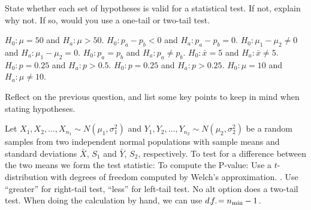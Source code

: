 \pagestyle{fancy}
\renewcommand{\theUnit}{8}
\ifthenelse{\isundefined{\UnitPageNumbers}}{}{\setcounter{page}{1}}
\rhead{Chapter  \theUnit: Hypothesis Tests}
\rfoot{\mypage}
\renewcommand{\footrulewidth}{.4pt}
\vspace*{-20pt} \thispagestyle{firstfooter}




\bb
\ii State whether each set of hypotheses is valid for a statistical test.  If not, explain why not.  If so, would you use a one-tail or two-tail test.

\bb
\ii $H_0:  \mu = 50$ and $H_a: \mu > 50$. \ms
\ii $H_0: p_a - p_b <0$ and $H_a:  p_a - p_b=0$. \ms
\ii $H_0:  \mu_1 - \mu_2 \ne 0 $ and $H_a: \mu_1 -\mu_2 =0$. \ms
\ii $H_0:  p_a = p_b$ and $H_a: p_a \ne p_b$. \ms
\ii $H_0: \bar{x} = 5$ and $H_a:  \bar{x} \ne 5$. \ms
\ii $H_0: p = 0.25$ and $H_a: p>0.5$. \ms
\ii $H_0: p = 0.25$ and $H_a: p>0.25$. \ms
\ii $H_0: \mu = 10$ and $H_a:  \mu \ne 10$. \ms
\ee


\ii Reflect on the previous question, and list some key points to keep in mind when stating hypotheses.

\vfill
\ee


\clearpage


\bbox
Let $X_1, X_2, \ldots , X_{n_1} \sim N(\mu_1, \sigma_1^2)$  and $Y_1, Y_2, \ldots , Y_{n_2} \sim N(\mu_2, \sigma_2^2)$ be a random samples from two independent normal populations  with sample means and standard deviations $\bar{X}$, $S_1$ and $\bar{Y}$, $S_2$, respectively. To test for a difference between the two means we form the test statistic:
To compute the P-value:
\bi
\ii Use a $t$-distribution with degrees of freedom computed by Welch's approximation.
\ii  \textbf{}.
\ii Use ``greater'' for right-tail test, ``less'' for left-tail test. No alt option does a two-tail test.
\ii When doing the calculation by hand, we can use $d.\!f.\! = n_{\rm min} -1$.
\ei
\ebox

